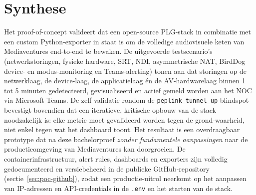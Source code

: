 \section{Synthese}
\label{sec:poc-synthese}

Het proof-of-concept valideert dat een open-source PLG-stack in combinatie met een custom Python-exporter in staat is om de volledige audiovisuele keten van Mediaventures end-to-end te bewaken. De uitgevoerde testscenario's (netwerkstoringen, fysieke hardware, SRT, NDI, asymmetrische NAT, BirdDog device- en modus-monitoring en Teams-alerting) tonen aan dat storingen op de netwerklaag, de device-laag, de applicatielaag én de AV-hardwarelaag binnen 1 tot 5 minuten gedetecteerd, gevisualiseerd en actief gemeld worden aan het NOC via Microsoft Teams. De zelf-validatie rondom de \texttt{peplink\_tunnel\_up}-blindspot bevestigt bovendien dat een iteratieve, kritische opbouw van de stack noodzakelijk is: elke metric moet gevalideerd worden tegen de grond-waarheid, niet enkel tegen wat het dashboard toont. Het resultaat is een overdraagbaar prototype dat na deze bachelorproef \emph{zonder fundamentele aanpassingen} naar de productieomgeving van Mediaventures kan doorgroeien. De containerinfrastructuur, alert rules, dashboards en exporters zijn volledig gedocumenteerd en versiebeheerd in de publieke GitHub-repository (sectie~\ref{sec:poc-github}), zodat een productie-uitrol neerkomt op het aanpassen van IP-adressen en API-credentials in de \texttt{.env} en het starten van de stack.
